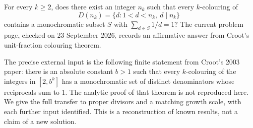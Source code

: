 For every $k\geq2$, does there exist an integer $n_k$ such that every
$k$-colouring of
\[
 D(n_k)=\{d:1<d<n_k,\ d\mid n_k\}
\]
contains a monochromatic subset $S$ with $\sum_{d\in S}1/d=1$?
The current problem page, checked on 23 September 2026, records an
affirmative answer from Croot's unit-fraction colouring theorem.

The precise external input is the following finite statement from
Croot's 2003 paper: there is an absolute constant $b>1$ such that
every $k$-colouring of the integers in $[2,b^k]$ has a monochromatic
set of distinct denominators whose reciprocals sum to $1$.
The analytic proof of that theorem is not reproduced here. We give
the full transfer to proper divisors and a matching growth scale,
with each further input identified. This is a reconstruction of known
results, not a claim of a new solution.
